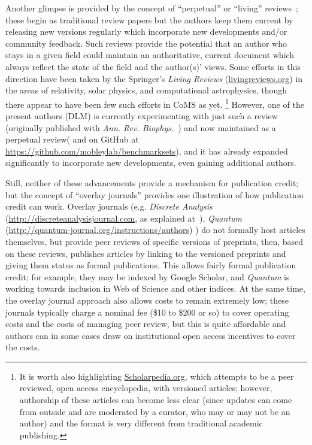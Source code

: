 \documentclass[9pt,editorial]{livecoms}
\begin{document}
Another glimpse is provided by the concept of ``perpetual'' or ``living'' reviews~\cite{Mobley:2015:arXiv:1502.01329[cs]}; these begin as traditional review papers but the authors keep them current by releasing new versions regularly which incorporate new developments and/or community feedback.
Such reviews provide the potential that an author who stays in a given field could maintain an authoritative, current document which always reflect the state of the field and the author(s)' views. 
Some efforts in this direction have been taken by the Springer's \emph{Living Reviews} (\url{livingreviews.org}) in the areas of relativity, solar physics, and computational astrophysics, though there appear to have been few such efforts in CoMS as yet. 
\footnote{It is worth also highlighting \url{Scholarpedia.org}, which attempts to be a peer reviewed, open access encyclopedia, with versioned articles; however, authorship of these articles can become less clear (since updates can come from outside and are moderated by a curator, who may or may not be an author) and the format is very different from traditional academic publishing.}
However, one of the present authors (DLM) is currently experimenting with just such a review (originally published with \emph{Ann. Rev. Biophys.}~\cite{Mobley:2017:AnnualReviewofBiophysics}) and now maintained as a perpetual review(\cite{Mobley:2017:eScholarshipa} and on GitHub at \url{https://github.com/mobleylab/benchmarksets}), and it has already expanded significantly to incorporate new developments, even gaining additional authors.

Still, neither of these advancements provide a mechanism for publication credit; but the concept of ``overlay journals'' provides one illustration of how publication credit can work.
Overlay journals (e.g. \emph{Discrete Analysis} (\url{http://discreteanalysisjournal.com}, as explained at~\cite{:2015:Gowers'sWeblog}), \emph{Quantum} (\url{http://quantum-journal.org/instructions/authors}) ) do not formally host articles themselves, but provide peer reviews of specific versions of preprints, then, based on these reviews, publishes articles by linking to the versioned preprints and giving them status as formal publications.
This allows fairly formal publication credit; for example, they may be indexed by Google Scholar, and \emph{Quantum} is working towards inclusion in Web of Science and other indices. 
At the same time, the overlay journal approach also allows costs to remain extremely low; these journals typically charge a nominal fee (\$10 to \$200 or so) to cover operating costs and the costs of managing peer review, but this is quite affordable and authors can in some cases draw on institutional open access incentives to cover the costs. 
\end{document}
